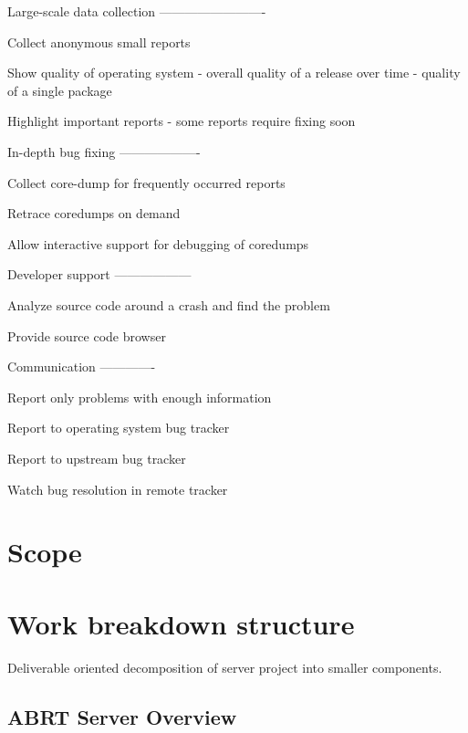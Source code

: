\documentclass{article}
\begin{document}
Large-scale data collection
-------------------------

Collect anonymous small reports

Show quality of operating system
- overall quality of a release over time
- quality of a single package

Highlight important reports
- some reports require fixing soon


In-depth bug fixing
-------------------

Collect core-dump for frequently occurred reports

Retrace coredumps on demand

Allow interactive support for debugging of coredumps


Developer support
------------------

Analyze source code around a crash and find the problem

Provide source code browser


Communication
-------------

Report only problems with enough information

Report to operating system bug tracker

Report to upstream bug tracker

Watch bug resolution in remote tracker


\section{Scope}

\section{Work breakdown structure}

Deliverable oriented decomposition of server project into smaller
components.

\subsection{ABRT Server Overview}
\end{document}
